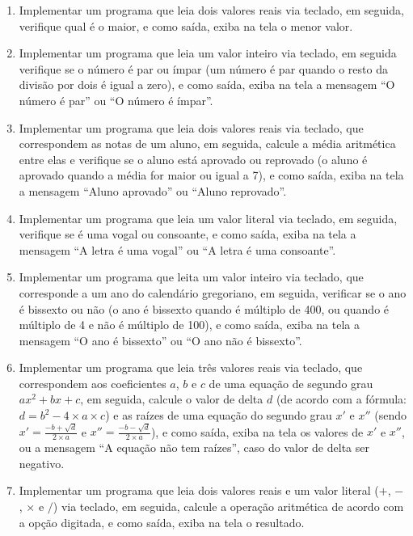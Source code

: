 \documentclass[11pt]{article}
\begin{document}
\begin{enumerate}
	\item Implementar um programa que leia dois valores reais via teclado, em seguida, verifique qual é o
	maior, e como saída, exiba na tela o menor valor.
	
	\item Implementar um programa que leia um valor inteiro via teclado, em seguida verifique se o número
	é par ou ímpar (um número é par quando o resto da divisão por dois é igual a zero), e como
	saída, exiba na tela a mensagem ``O número é par'' ou ``O número é ímpar''.
	
	\item Implementar um programa que leia dois valores reais via teclado, que correspondem as notas de
	um aluno, em seguida, calcule a média aritmética entre elas e verifique se o aluno está aprovado
	ou reprovado (o aluno é aprovado quando a média for maior ou igual a 7), e como saída, exiba
	na tela a mensagem ``Aluno aprovado'' ou ``Aluno reprovado''.
	
	\item Implementar um programa que leia um valor literal via teclado, em seguida, verifique se é uma
	vogal ou consoante, e como saída, exiba na tela a mensagem ``A letra é uma vogal'' ou ``A letra é
	uma consoante''.
	
	\item Implementar um programa que leita um valor inteiro via teclado, que corresponde a um ano do
	calendário gregoriano, em seguida, verificar se o ano é bissexto ou não (o ano é bissexto quando
	é múltiplo de 400, ou quando é múltiplo de 4 e não é múltiplo de 100), e como saída, exiba na
	tela a mensagem ``O ano é bissexto'' ou ``O ano não é bissexto''.
	
	\item  Implementar um programa que leia três valores reais via teclado, que correspondem aos
	coeficientes $a$, $b$ e $c$ de uma equação de segundo grau $ax^{2} + bx + c$, em seguida, calcule o valor
	de delta $d$ (de acordo com a fórmula: $d = b^{2} - 4 \times a \times c$) e as raízes de uma equação do segundo
	grau $x'$ e $x''$ (sendo $x'= \frac{-b + \sqrt{d}}{2 \times a}$ e $x''= \frac{-b - \sqrt{d}}{2 \times a}$), e como saída, exiba na tela os valores de $x'$
	e $x''$, ou a mensagem ``A equação não tem raízes'', caso do valor de delta ser negativo.
	
	\item Implementar um programa que leia dois valores reais e um valor literal ($+$, $-$ , $\times$ e $/$) via teclado,
	em seguida, calcule a operação aritmética de acordo com a opção digitada, e como saída, exiba
	na tela o resultado.
	

\end{enumerate}
\end{document}
